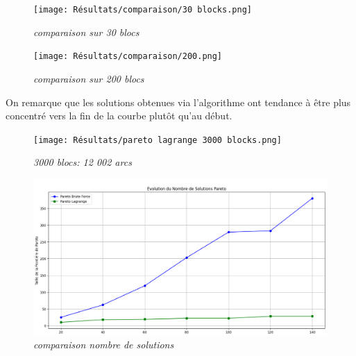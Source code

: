 \documentclass[]{article}
\begin{document}
        \begin{figure}[H]
            \centering
            \texttt{[image: Résultats/comparaison/30 blocks.png]}
            \caption{\textit{comparaison sur 30 blocs}}
        \end{figure}

        \begin{figure}[H]
            \hspace{-2cm}
            \centering
            \texttt{[image: Résultats/comparaison/200.png]}
            \caption{\textit{comparaison sur 200 blocs}}
        \end{figure}

        On remarque que les solutions obtenues via l'algorithme ont tendance à être plus
        concentré vers la fin de la courbe plutôt qu'au début.

        \begin{figure}[H]
            \centering
            \texttt{[image: Résultats/pareto lagrange 3000 blocks.png]}
            \caption{\textit{3000 blocs: 12 002 arcs}}
        \end{figure}


        \begin{figure}[H]
            \centering
            \includegraphics[width=1.1\textwidth]{output/lagrange 10 28 brute force 25 380.png}
            \caption{\textit{comparaison nombre de solutions}}
        \end{figure}




        
\end{document}
